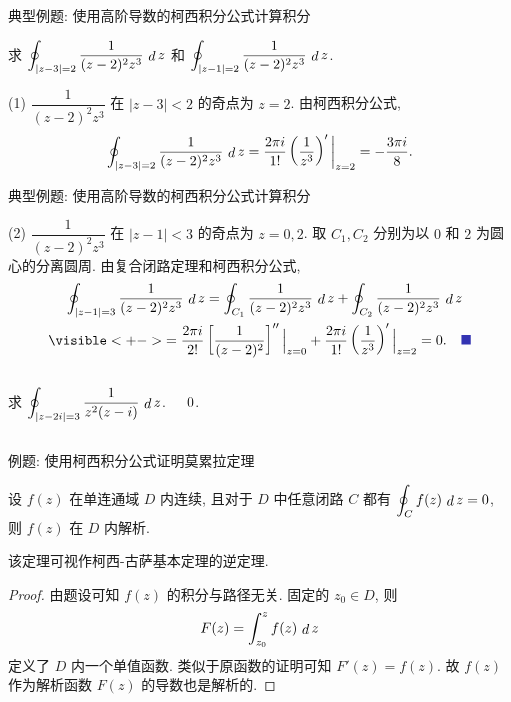 \begin{frame}{典型例题: 使用高阶导数的柯西积分公式计算积分}
\begin{example}
求 $\displaystyle\oint_{|z-3|=2}\frac1{(z-2)^2z^3}\,\mathop{d} z$ 和 $\displaystyle\oint_{|z-1|=2}\frac1{(z-2)^2z^3}\,\mathop{d} z$.
\end{example}
\begin{solutions}
(1) $\dfrac1{(z-2)^2z^3}$ 在 $|z-3|<2$ 的奇点为 $z=2$.
\onslide<+->
由柯西积分公式,
\[
	 \oint_{|z-3|=2}\frac1{(z-2)^2z^3}\,\mathop{d} z
	=\frac{2\pi i}{1!}\left(\frac1{z^3}\right)'\bigg|_{z=2}
	=-\frac{3\pi i}8.
\]
\end{solutions}
\end{frame}


\begin{frame}[<*>]{典型例题: 使用高阶导数的柯西积分公式计算积分}
\onslide<+->
\begin{solutionc}
(2) $\dfrac1{(z-2)^2z^3}$ 在 $|z-1|<3$ 的奇点为 $z=0,2$.
\onslide<+->
取 $C_1,C_2$ 分别为以 $0$ 和 $2$ 为圆心的分离圆周.
\onslide<+->
由复合闭路定理和柯西积分公式,
\onslide<+->
\begin{align*}
	&\peq\oint_{|z-1|=3}\frac1{(z-2)^2z^3}\diff z
		=\oint_{C_1}\frac1{(z-2)^2z^3}\diff z
		 +\oint_{C_2}\frac1{(z-2)^2z^3}\diff z\\
	&\visible<+->{
		=\frac{2\pi i}{2!}\left[\frac1{(z-2)^2}\right]''\Big|_{z=0}
		 +\frac{2\pi i}{1!}\left(\frac1{z^3}\right)'\Big|_{z=2}=0.\mqed
	}
\end{align*}
\end{solutionc}
\onslide<+->
\begin{columns}
		\begin{exercise}
		求 $\displaystyle\oint_{|z-2i|=3}\frac1{z^2(z-i)}\,\mathop{d} z$.
		\end{exercise}\onslide<+->
		\begin{answer}
		$0\vphantom{\displaystyle\oint_{|z-2i|=3}\frac1{z^2(z-i)}\diff z}$.
		\end{answer}
\end{columns}
\end{frame}


\begin{frame}{例题: 使用柯西积分公式证明莫累拉定理}
\begin{example}[莫累拉定理]
设 $f(z)$ 在单连通域 $D$ 内连续, 且对于 $D$ 中任意闭路 $C$ 都有 $\displaystyle\oint_Cf(z)\,\mathop{d} z=0$, 则 $f(z)$ 在 $D$ 内解析.
\end{example}
\onslide<+->
该定理可视作柯西-古萨基本定理的逆定理.
\begin{proof}
由题设可知 $f(z)$ 的积分与路径无关.
\onslide<+->
固定的 $z_0\in D$, 则
\[F(z)=\int_{z_0}^zf(z)\,\mathop{d} z\]
定义了 $D$ 内一个单值函数.
\onslide<+->
类似于原函数的证明可知 $F'(z)=f(z)$.
\onslide<+->
故 $f(z)$ 作为解析函数 $F(z)$ 的导数也是解析的.
\end{proof}
\end{frame}


